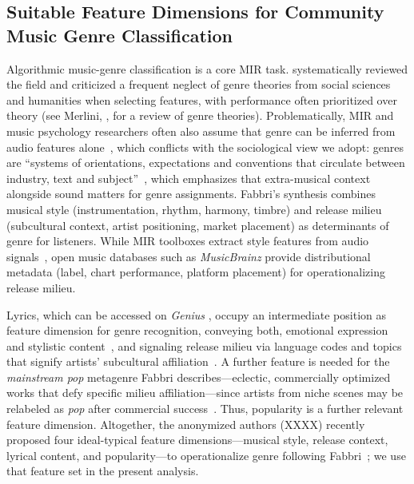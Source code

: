 \documentclass{article}
\begin{document}
\subsection{Suitable Feature Dimensions for Community Music Genre Classification}
Algorithmic music-genre classification is a core MIR task. \cite{greenCriticalSurveyResearch2024} systematically reviewed the field and criticized a frequent neglect of genre theories from social sciences and humanities when selecting features, with performance often prioritized over theory (see Merlini, \citeyear{merliniCriticalInterdisciplinarySurvey2020}, for a review of genre theories). Problematically, MIR and music psychology researchers often also assume that genre can be inferred from audio features alone~\citep{tzanetakisMusicalGenreClassification2002,rentfrowStructureMusicalPreferences2011}, which conflicts with the sociological view we adopt: genres are ``systems of orientations, expectations and conventions that circulate between industry, text and subject''~\cite[p. 19]{nealeGenre1980}, which emphasizes that extra-musical context alongside sound matters for genre assignments. Fabbri's synthesis \citeyearpar{fabbriTheoryMusicalGenres1982} combines musical style (instrumentation, rhythm, harmony, timbre) and release milieu (subcultural context, artist positioning, market placement) as determinants of genre for listeners. While MIR toolboxes extract style features from audio signals~\citep{bogdanovESSENTIAOpensourceLibrary2013},  open music databases such as \textit{MusicBrainz} \citeyearpar{MusicBrainz_nodate} provide distributional metadata (label, chart performance, platform placement) for operationalizing release milieu. 


Lyrics, which can be accessed on  \textit{Genius} \citeyearpar{genius}, occupy an intermediate position as feature dimension for genre recognition, conveying both, emotional expression and stylistic content~\citep{brandCulturalEvolutionEmotional2019}, and signaling release milieu via language codes and topics that signify artists' subcultural affiliation~\citep{carboneStatusMarkersPopular2024}. A further feature is needed for the \textit{mainstream pop} metagenre Fabbri \citeyearpar{fabbriTheoryMusicalGenres1982} describes—eclectic, commercially optimized works that defy specific milieu affiliation—since artists from niche scenes may be relabeled as \textit{pop} after commercial success~\cite[p. 20]{holtGenrePopularMusic2007}. Thus, popularity is a further relevant feature dimension. Altogether, the anonymized authors (XXXX) %
recently proposed four ideal-typical feature dimensions—musical style, release context, lyrical content, and popularity—to operationalize genre following Fabbri~\citeyearpar{fabbriTheoryMusicalGenres1982}; we use that feature set in the present analysis. 
\end{document}

